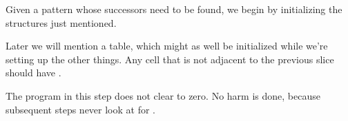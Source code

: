 Given a pattern  whose successors need to be found,
we begin by initializing the structures just mentioned.

Later we will mention a  table, which might as well be
initialized while we're setting up the other things.
Any cell that is not adjacent to the
previous slice should have .

The program in this step does not clear  to zero.
No harm is done, because subsequent steps never look at  for
.

